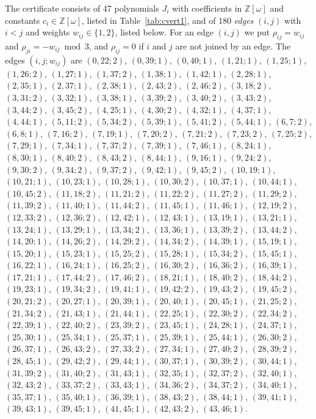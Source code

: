 \documentclass[11pt]{article}
\newcommand{\Z}{\mathbb{Z}}
\begin{document}
The certificate consists of 47 polynomials $J_i$ with coefficients in $\Z[\omega]$ and constants $c_i\in\Z[\omega]$, listed in Table~\ref{tab:cvert1}, and of 180 \emph{edges} $(i,j)$ with $i<j$ and weights $w_{ij}\in\{1,2\}$, listed below. For an edge $(i,j)$ we put $\rho_{ij}=w_{ij}$ and $\rho_{ji}=-w_{ij}\bmod 3$, and $\rho_{ij}=0$ if $i$ and $j$ are not joined by an edge.
The edges $(i,j;w_{ij})$ are $(0,22;2)$, $(0,39;1)$, $(0,40;1)$, $(1,21;1)$, $(1,25;1)$, $(1,26;2)$, $(1,27;1)$, $(1,37;2)$, $(1,38;1)$, $(1,42;1)$, $(2,28;1)$, $(2,35;1)$, $(2,37;1)$, $(2,38;1)$, $(2,43;2)$, $(2,46;2)$, $(3,18;2)$, $(3,31;2)$, $(3,32;1)$, $(3,38;1)$, $(3,39;2)$, $(3,40;2)$, $(3,43;2)$, $(3,44;2)$, $(3,45;2)$, $(4,25;1)$, $(4,30;2)$, $(4,32;1)$, $(4,37;1)$, $(4,44;1)$, $(5,11;2)$, $(5,34;2)$, $(5,39;1)$, $(5,41;2)$, $(5,44;1)$, $(6,7;2)$, $(6,8;1)$, $(7,16;2)$, $(7,19;1)$, $(7,20;2)$, $(7,21;2)$, $(7,23;2)$, $(7,25;2)$, $(7,29;1)$, $(7,34;1)$, $(7,37;2)$, $(7,39;1)$, $(7,46;1)$, $(8,24;1)$, $(8,30;1)$, $(8,40;2)$, $(8,43;2)$, $(8,44;1)$, $(9,16;1)$, $(9,24;2)$, $(9,30;2)$, $(9,34;2)$, $(9,37;2)$, $(9,42;1)$, $(9,45;2)$, $(10,19;1)$, $(10,21;1)$, $(10,23;1)$, $(10,28;1)$, $(10,30;2)$, $(10,37;1)$, $(10,44;1)$, $(10,45;2)$, $(11,18;2)$, $(11,21;2)$, $(11,22;2)$, $(11,27;2)$, $(11,29;2)$, $(11,39;2)$, $(11,40;1)$, $(11,44;2)$, $(11,45;1)$, $(11,46;1)$, $(12,19;2)$, $(12,33;2)$, $(12,36;2)$, $(12,42;1)$, $(12,43;1)$, $(13,19;1)$, $(13,21;1)$, $(13,24;1)$, $(13,29;1)$, $(13,34;2)$, $(13,36;1)$, $(13,39;2)$, $(13,44;2)$, $(14,20;1)$, $(14,26;2)$, $(14,29;2)$, $(14,34;2)$, $(14,39;1)$, $(15,19;1)$, $(15,20;1)$, $(15,23;1)$, $(15,25;2)$, $(15,28;1)$, $(15,34;2)$, $(15,45;1)$, $(16,22;1)$, $(16,24;1)$, $(16,25;2)$, $(16,30;2)$, $(16,36;2)$, $(16,39;1)$, $(17,21;1)$, $(17,44;2)$, $(17,46;2)$, $(18,21;1)$, $(18,40;2)$, $(18,44;2)$, $(19,23;1)$, $(19,34;2)$, $(19,41;1)$, $(19,42;2)$, $(19,43;2)$, $(19,45;2)$, $(20,21;2)$, $(20,27;1)$, $(20,39;1)$, $(20,40;1)$, $(20,45;1)$, $(21,25;2)$, $(21,34;2)$, $(21,43;1)$, $(21,44;1)$, $(22,25;1)$, $(22,30;2)$, $(22,34;2)$, $(22,39;1)$, $(22,40;2)$, $(23,39;2)$, $(23,45;1)$, $(24,28;1)$, $(24,37;1)$, $(25,30;1)$, $(25,34;1)$, $(25,37;1)$, $(25,39;1)$, $(25,44;1)$, $(26,30;2)$, $(26,37;1)$, $(26,43;2)$, $(27,33;2)$, $(27,34;1)$, $(27,40;2)$, $(28,39;2)$, $(28,45;1)$, $(29,42;2)$, $(29,44;1)$, $(30,37;1)$, $(30,39;2)$, $(30,44;1)$, $(31,39;2)$, $(31,40;2)$, $(31,43;1)$, $(32,35;1)$, $(32,37;2)$, $(32,40;1)$, $(32,43;2)$, $(33,37;2)$, $(33,43;1)$, $(34,36;2)$, $(34,37;2)$, $(34,40;1)$, $(35,37;1)$, $(35,40;1)$, $(36,39;1)$, $(38,43;2)$, $(38,44;1)$, $(39,41;1)$, $(39,43;1)$, $(39,45;1)$, $(41,45;1)$, $(42,43;2)$, $(43,46;1)$.
\end{document}
